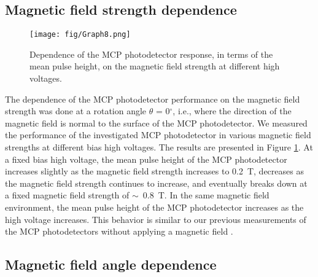 \documentclass[preprint,5p]{elsarticle}
\begin{document}
\subsection{Magnetic field strength dependence}\label{subsec_HV}
\begin{figure}[tbp]
\hspace{-1.0 cm} \texttt{[image: fig/Graph8.png]}
\caption{Dependence of the MCP photodetector response, in terms of the mean 
pulse height, on the magnetic field strength at different high voltages.} 
\label{fig:MCPs_gain_B_HV}
\end{figure}

The dependence of the MCP photodetector performance on the magnetic field 
strength was done at a rotation angle $\theta$ = 0$^{\circ}$, i.e., where the 
direction of the magnetic field is normal to the surface of the MCP 
photodetector. We measured the performance of the investigated MCP 
photodetector in various magnetic field strengths at different bias high 
voltages. The results are presented in Figure \ref{fig:MCPs_gain_B_HV}. At a 
fixed bias high voltage, the mean pulse height of the MCP photodetector 
increases slightly as the magnetic field strength increases to 0.2~T, decreases 
as the magnetic field strength continues to increase, and eventually breaks 
down at a fixed magnetic field strength of $\sim$~0.8~T. In the same magnetic 
field environment, the mean pulse height of the MCP photodetector increases as 
the high voltage increases. This behavior is similar to our previous 
measurements of the MCP photodetectors without applying a magnetic field 
\cite{Wang-MCPs}. 


\subsection{Magnetic field angle dependence}\label{subsec_theta}
\end{document}
